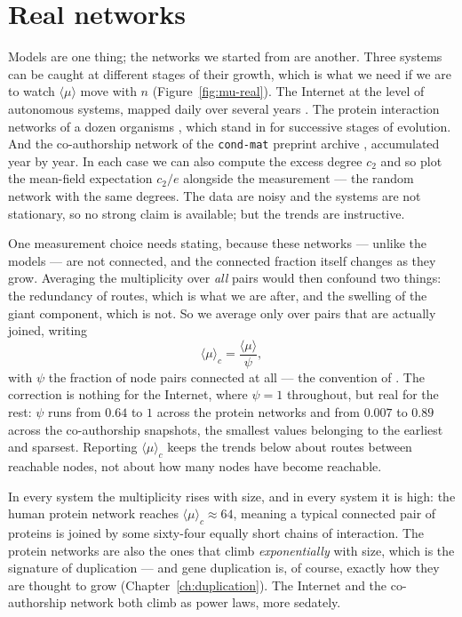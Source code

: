 \section{Real networks}

Models are one thing; the networks we started from are another. Three systems can
be caught at different stages of their growth, which is what we need if we are to
watch $\langle\mu\rangle$ move with $n$ (Figure~\ref{fig:mu-real}). The Internet
at the level of autonomous systems, mapped daily over several years
\citep{snapnets}. The protein interaction networks of a dozen organisms
\citep{stark2006}, which stand in for successive stages of evolution. And the
co-authorship network of the \texttt{cond-mat} preprint archive
\citep{cornellarxiv}, accumulated year by year. In each case we can also compute
the excess degree $c_2$ and so plot the mean-field expectation
$c_2/e$ alongside the measurement --- the random network with the same degrees.
The data are noisy and the systems are not stationary, so no strong claim is
available; but the trends are instructive.

One measurement choice needs stating, because these networks --- unlike the models
--- are not connected, and the connected fraction itself changes as they grow.
Averaging the multiplicity over \emph{all} pairs would then confound two things:
the redundancy of routes, which is what we are after, and the swelling of the
giant component, which is not. So we average only over pairs that are actually
joined, writing
\begin{equation}
  \langle\mu\rangle_c = \frac{\langle\mu\rangle}{\psi},
  \label{eq:path-muc}
\end{equation}
with $\psi$ the fraction of node pairs connected at all --- the convention of
\citet{deng2026}. The correction is nothing for the Internet, where $\psi=1$
throughout, but real for the rest: $\psi$ runs from $0.64$ to $1$ across the
protein networks and from $0.007$ to $0.89$ across the co-authorship snapshots,
the smallest values belonging to the earliest and sparsest. Reporting
$\langle\mu\rangle_c$ keeps the trends below about routes between reachable nodes,
not about how many nodes have become reachable.

In every system the multiplicity rises with size, and in every system it is
high: the human protein network reaches $\langle\mu\rangle_c\approx64$, meaning a
typical connected pair of proteins is joined by some sixty-four equally short
chains of interaction. The protein networks are also the ones that climb
\emph{exponentially} with size, which is the signature of duplication --- and gene
duplication is, of course, exactly how they are thought to grow
(Chapter~\ref{ch:duplication}). The Internet and the co-authorship network both
climb as power laws, more sedately.

